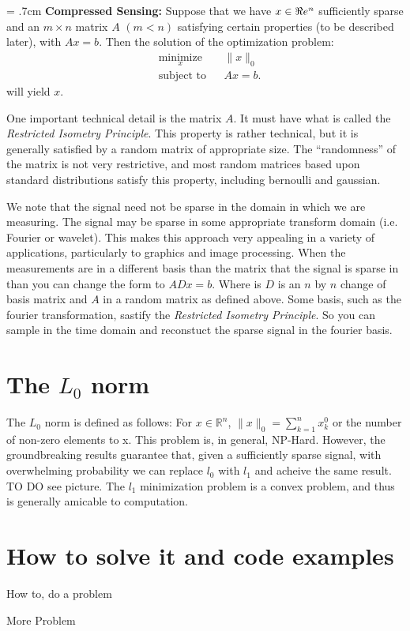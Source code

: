 \hangindent = .7cm
\setlength{\parindent}{.7cm}
\textbf{Compressed Sensing:} Suppose that we have $x \in \Re e^n$  sufficiently sparse and an $m \times n$ matrix $A$ $(m < n)$ satisfying certain properties (to be described later), with $Ax = b$. Then the solution of the optimization problem:
\begin{equation*}
\begin{aligned}
& \underset{x}{\text{minimize}}
& & \|x\|_0\\
& \text{subject to}
& & Ax = b.
\end{aligned}
\end{equation*}
 will yield $x$.
\setlength{\parindent}{0cm}

One important technical detail is the matrix $A$.  It must have what is called the \emph{Restricted Isometry Principle}. This property is rather technical, but it is generally satisfied by a random matrix of appropriate size. The ``randomness'' of the matrix is not very restrictive, and most random matrices based upon standard distributions satisfy this property, including bernoulli and gaussian.

We note that the signal need not be sparse in the domain in which we are measuring. The signal may be sparse in some appropriate transform domain (i.e. Fourier or wavelet). This makes this approach very appealing in a variety of applications, particularly to graphics and image processing. When the measurements are in a different basis than the matrix that the signal is sparse in than you can change the form to $ADx = b$. Where is $D$ is an $n$ by $n$ change of basis matrix and $A$ in a random matrix as defined above. Some basis, such as the fourier transformation, sastify the \emph{Restricted Isometry Principle}. So you can sample in the time domain and reconstuct the sparse signal in the fourier basis.

\section*{The $L_0$ norm}

The $L_0$ norm is defined as follows: For $x \in \mathbb{R}^n$, $\|x\|_0=\sum_{k=1}^n{x_k^0}$ or the number of non-zero elements to x. This problem is, in general, NP-Hard. However, the groundbreaking results  guarantee that, given a sufficiently sparse signal, with overwhelming probability we can replace $l_0$ with $l_1$ and acheive the same result. 
TO DO see picture.
The $l_1$ minimization problem is a convex problem, and thus is generally amicable to computation.

\section*{How to solve it and code examples}


\begin{problem}
How to, do a problem 
\end{problem}

\begin{problem}
More Problem
\end{problem}



